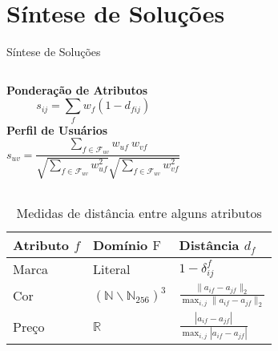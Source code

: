 \section[Síntese de Soluções]{Síntese de Soluções}
\begin{frame}{Síntese de Soluções}
\begin{columns}[c]
\textbf{Ponderação de Atributos}
$$
    s_{ij} = \sum_{f}{w_{f} \left(1-d_{fij}\right)}
$$
\vspace{0.35cm}
\textbf{Perfil de Usuários}
$$
    s_{uv} = \frac{\sum\limits_{f \in \mathcal{F}_{uv}}{w_{uf}~w_{vf}}}{\sqrt{\sum\limits_{f \in \mathcal{F}_{uv}
    }w_{uf}^2} \sqrt{\sum\limits_{f \in \mathcal{F}_{uv}}w_{vf}^2}} 
$$
\end{columns}


\begin{table}[hp]
\begin{center}
    \caption{Medidas de distância entre alguns atributos}
    \label{tab:medidas-distancia}
    \begin{tabular}{  | p{3cm} | p{3cm} | p{3cm} | } 
    \hline
    \textbf{Atributo} $f$ & \textbf{Domínio} $\mathrm{F}$ & \textbf{Distância} $d_f$ \\ \hline
    Marca & Literal & $1-\delta^f_{ij}$ \\ \hline    
    Cor & $\left(\mathbb{N}\backslash \mathbb{N}_{256}\right)^3$  & $ \frac{\lVert a_{if}-a_{jf} \rVert_2}{\max_{i,j}{\lVert a_{if}-a_{jf} \rVert_2}} $ \\ \hline
    Preço & $\mathbb{R}$ & $ \frac{\left| a_{if}-a_{jf} \right|}{\max_{i,j}{\left| a_{if}-a_{jf} \right|}} $ \\ \hline
    \end{tabular}
\end{center}
\end{table}
\end{frame}




